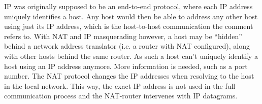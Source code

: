IP was originally supposed to be an end-to-end protocol, where each IP address uniquely
identifies a host. Any host would then be able to address any other host using just its
IP address, which is the host-to-host communication the comment refers to. With NAT and
IP masquerading however, a host may be ``hidden'' behind a network address translator
(i.e. a router with NAT configured), along with other hosts behind the same router. As
such a host can't uniquely identify a host using an IP address anymore. More information
is needed, such as a port number. The NAT protocol changes the IP addresses when
resolving to the host in the local network. This way, the exact IP address is not used
in the full communication process and the NAT-router intervenes with IP datagrams.
